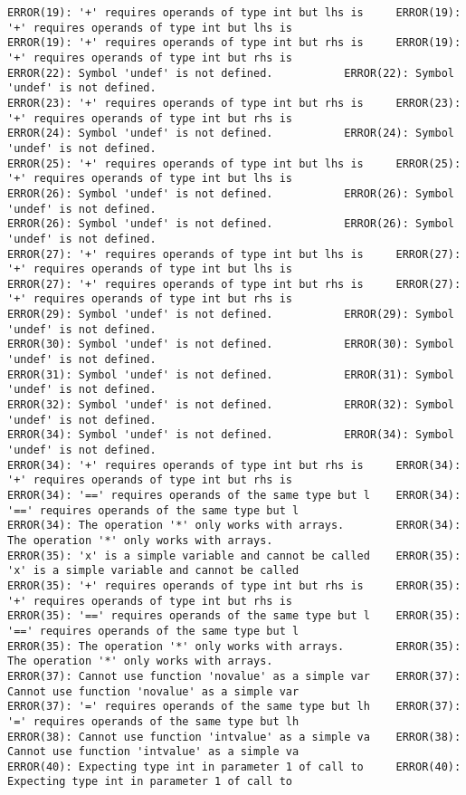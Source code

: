 \documentclass[12pt]{book}
\begin{document}
\begin{lstlisting}
ERROR(19): '+' requires operands of type int but lhs is 	ERROR(19): '+' requires operands of type int but lhs is 
ERROR(19): '+' requires operands of type int but rhs is 	ERROR(19): '+' requires operands of type int but rhs is 
ERROR(22): Symbol 'undef' is not defined.			ERROR(22): Symbol 'undef' is not defined.
ERROR(23): '+' requires operands of type int but rhs is 	ERROR(23): '+' requires operands of type int but rhs is 
ERROR(24): Symbol 'undef' is not defined.			ERROR(24): Symbol 'undef' is not defined.
ERROR(25): '+' requires operands of type int but lhs is 	ERROR(25): '+' requires operands of type int but lhs is 
ERROR(26): Symbol 'undef' is not defined.			ERROR(26): Symbol 'undef' is not defined.
ERROR(26): Symbol 'undef' is not defined.			ERROR(26): Symbol 'undef' is not defined.
ERROR(27): '+' requires operands of type int but lhs is 	ERROR(27): '+' requires operands of type int but lhs is 
ERROR(27): '+' requires operands of type int but rhs is 	ERROR(27): '+' requires operands of type int but rhs is 
ERROR(29): Symbol 'undef' is not defined.			ERROR(29): Symbol 'undef' is not defined.
ERROR(30): Symbol 'undef' is not defined.			ERROR(30): Symbol 'undef' is not defined.
ERROR(31): Symbol 'undef' is not defined.			ERROR(31): Symbol 'undef' is not defined.
ERROR(32): Symbol 'undef' is not defined.			ERROR(32): Symbol 'undef' is not defined.
ERROR(34): Symbol 'undef' is not defined.			ERROR(34): Symbol 'undef' is not defined.
ERROR(34): '+' requires operands of type int but rhs is 	ERROR(34): '+' requires operands of type int but rhs is 
ERROR(34): '==' requires operands of the same type but l	ERROR(34): '==' requires operands of the same type but l
ERROR(34): The operation '*' only works with arrays.		ERROR(34): The operation '*' only works with arrays.
ERROR(35): 'x' is a simple variable and cannot be called	ERROR(35): 'x' is a simple variable and cannot be called
ERROR(35): '+' requires operands of type int but rhs is 	ERROR(35): '+' requires operands of type int but rhs is 
ERROR(35): '==' requires operands of the same type but l	ERROR(35): '==' requires operands of the same type but l
ERROR(35): The operation '*' only works with arrays.		ERROR(35): The operation '*' only works with arrays.
ERROR(37): Cannot use function 'novalue' as a simple var	ERROR(37): Cannot use function 'novalue' as a simple var
ERROR(37): '=' requires operands of the same type but lh	ERROR(37): '=' requires operands of the same type but lh
ERROR(38): Cannot use function 'intvalue' as a simple va	ERROR(38): Cannot use function 'intvalue' as a simple va
ERROR(40): Expecting type int in parameter 1 of call to 	ERROR(40): Expecting type int in parameter 1 of call to 

\end{lstlisting}
\end{document}
